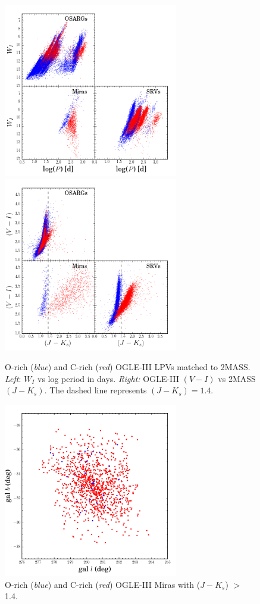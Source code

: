 \begin{figure}[h]
\includegraphics[width=3in]{figs/ogle_2mass_period_mag_threeplot.png}
\includegraphics[width=3in]{figs/ogle_2mass_color_color_threeplot.png}
\caption{O-rich (\emph{blue}) and C-rich (\emph{red}) OGLE-III LPVs matched to 2MASS. \emph{Left}: $W_I$ vs log period in days. \emph{Right:} OGLE-III $(V-I)$ vs 2MASS $(J-K_s)$. The dashed line represents $(J-K_s) = 1.4$. \label{fig:oglepmag}}
\end{figure}

\begin{figure}[h]
\includegraphics[width=3in]{figs/ogle_2mass_wise_miras.pdf}
\caption{O-rich (\emph{blue}) and C-rich (\emph{red}) OGLE-III Miras with ($J-K_s$) $>$ 1.4. \label{fig:oglegalplot}}
\end{figure}

